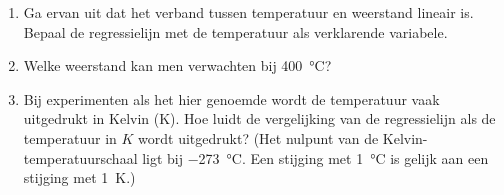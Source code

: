 
\begin{enumerate}[label=(\alph*)]
    \item Ga ervan uit dat het verband tussen temperatuur en weerstand lineair is.
    Bepaal de regressielijn met de temperatuur als verklarende variabele.
    \answer{

    }

    \item Welke weerstand kan men verwachten bij \SI{400}{\celsius}?
    \answer{

    }

    \item Bij experimenten als het hier genoemde wordt de temperatuur vaak uitgedrukt in Kelvin (\si{\kelvin}).
    Hoe luidt de vergelijking van de regressielijn als de temperatuur in $K$ wordt uitgedrukt?
    (Het nulpunt van de Kelvin-temperatuurschaal ligt bij \SI{-273}{\celsius}.
    Een stijging met \SI{1}{\celsius} is gelijk aan een stijging met \SI{1}{\kelvin}.)
    \answer{
    
    }
\end{enumerate}